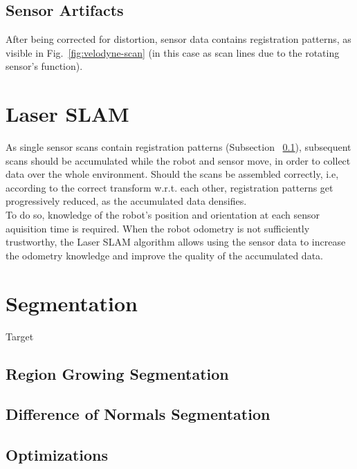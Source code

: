 \subsection{Sensor Artifacts}
\label{subsec:artifacts}

After being corrected for distortion, sensor data contains registration patterns, as visible in Fig.~\ref{fig:velodyne-scan} (in this case as scan lines due to the rotating sensor's function).
\section{Laser SLAM}
\label{sec:SLAM}

As single sensor scans contain registration patterns (Subsection ~\ref{subsec:artifacts}), subsequent scans should be accumulated while the robot and sensor move, in order to collect data over the whole environment. Should the scans be assembled correctly, i.e, according to the correct transform w.r.t. each other, registration patterns get progressively reduced, as the accumulated data densifies.\\

To do so, knowledge of the robot's position and orientation at each sensor aquisition time is required. When the robot odometry is not sufficiently trustworthy, the Laser SLAM algorithm allows using the sensor data to increase the odometry knowledge and improve the quality of the accumulated data.\\

\section{Segmentation}
\label{sec:segmentation}

Target

\subsection{Region Growing Segmentation}
\label{subsec:region-growing}

\subsection{Difference of Normals Segmentation}
\label{subsec:DoN}

\subsection{Optimizations}
\label{subsec:optimizations}

